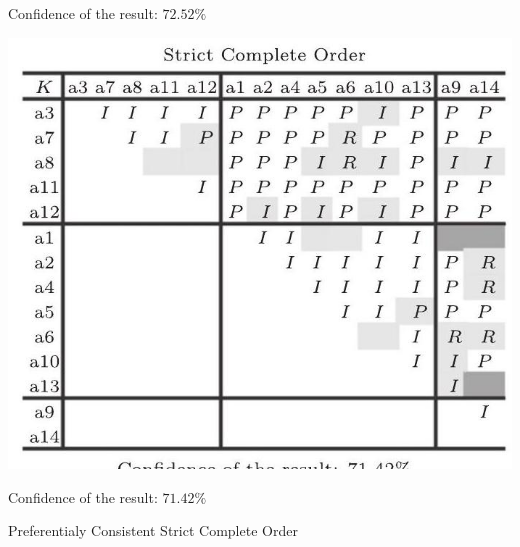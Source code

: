 \documentclass[10pt]{article}
\begin{document}
Confidence of the result: $72.52 \%$

\begin{center}
\includegraphics[max width=\textwidth]{2024_01_11_fda3c6ffd32dd805faacg-7(3)}
\end{center}

Confidence of the result: $71.42 \%$

Preferentialy Consistent Strict Complete Order
\end{document}
